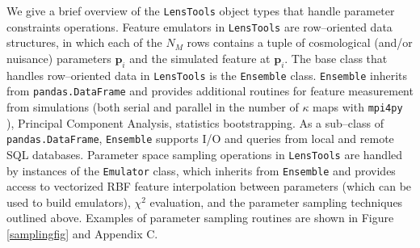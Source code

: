 \documentclass[reprint,aps,prd,superscriptaddress,showkeys,showpacs]{revtex4-1}
\newcommand{\bb}[1]{\mathbf{#1}}
\newcommand{\ttt}[1]{\texttt{#1}}
\newcommand{\LT}{\texttt{LensTools} }
\begin{document}
We give a brief overview of the \LT object types that handle parameter constraints operations. Feature emulators in \LT are row--oriented data structures, in which each of the $N_M$ rows contains a tuple of cosmological (and/or nuisance) parameters $\bb{p}_i$ and the simulated feature at $\bb{p}_i$. The base class that handles row--oriented data in \LT is the \ttt{Ensemble} class. \ttt{Ensemble} inherits from \ttt{pandas.DataFrame} \citep{pandas} and provides additional routines for feature measurement from simulations (both serial and parallel in the number of $\kappa$ maps with \ttt{mpi4py} \citep{mpi4py}), Principal Component Analysis, statistics bootstrapping. As a sub--class of \ttt{pandas.DataFrame}, \ttt{Ensemble} supports I/O and queries from local and remote SQL databases. Parameter space sampling operations in \LT are handled by instances of the \ttt{Emulator} class, which inherits from \ttt{Ensemble} and provides access to vectorized RBF feature interpolation between parameters (which can be used to build emulators), $\chi^2$ evaluation, and the parameter sampling techniques outlined above. Examples of parameter sampling routines are shown in Figure \ref{samplingfig} and Appendix C.          
\end{document}
